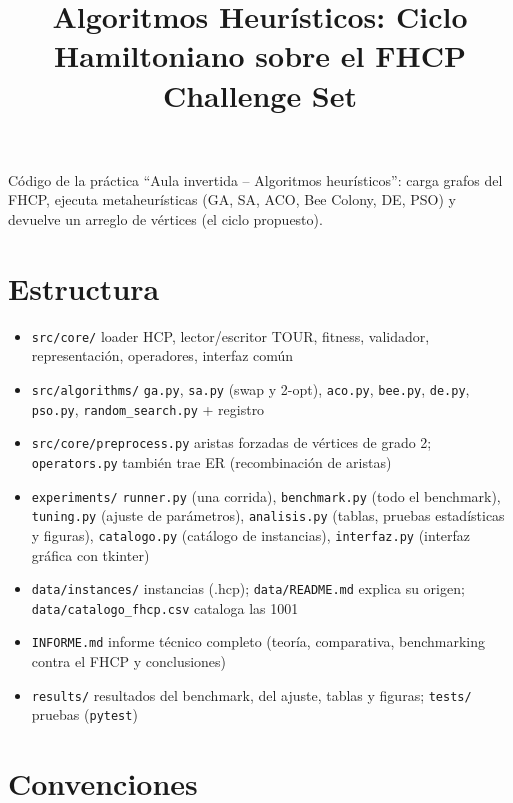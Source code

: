 \documentclass[
  spanish,
  11pt,
]{article}
\title{Algoritmos Heurísticos: Ciclo Hamiltoniano sobre el FHCP
Challenge Set}
\author{}
\date{}
\providecommand{\tightlist}{%
  \setlength{\itemsep}{0pt}\setlength{\parskip}{0pt}}
\begin{document}
\maketitle

Código de la práctica ``Aula invertida -- Algoritmos heurísticos'':
carga grafos del FHCP, ejecuta metaheurísticas (GA, SA, ACO, Bee Colony,
DE, PSO) y devuelve un arreglo de vértices (el ciclo propuesto).

\section{Estructura}\label{estructura}

\begin{itemize}
\tightlist
\item
  \texttt{src/core/} loader HCP, lector/escritor TOUR, fitness,
  validador, representación, operadores, interfaz común
\item
  \texttt{src/algorithms/} \texttt{ga.py}, \texttt{sa.py} (swap y
  2-opt), \texttt{aco.py}, \texttt{bee.py}, \texttt{de.py},
  \texttt{pso.py}, \texttt{random\_search.py} + registro
\item
  \texttt{src/core/preprocess.py} aristas forzadas de vértices de grado
  2; \texttt{operators.py} también trae ER (recombinación de aristas)
\item
  \texttt{experiments/} \texttt{runner.py} (una corrida),
  \texttt{benchmark.py} (todo el benchmark), \texttt{tuning.py} (ajuste
  de parámetros), \texttt{analisis.py} (tablas, pruebas estadísticas y
  figuras), \texttt{catalogo.py} (catálogo de instancias),
  \texttt{interfaz.py} (interfaz gráfica con tkinter)
\item
  \texttt{data/instances/} instancias (.hcp); \texttt{data/README.md}
  explica su origen; \texttt{data/catalogo\_fhcp.csv} cataloga las 1001
\item
  \texttt{INFORME.md} informe técnico completo (teoría, comparativa,
  benchmarking contra el FHCP y conclusiones)
\item
  \texttt{results/} resultados del benchmark, del ajuste, tablas y
  figuras; \texttt{tests/} pruebas (\texttt{pytest})
\end{itemize}

\section{Convenciones}\label{convenciones}
\end{document}
